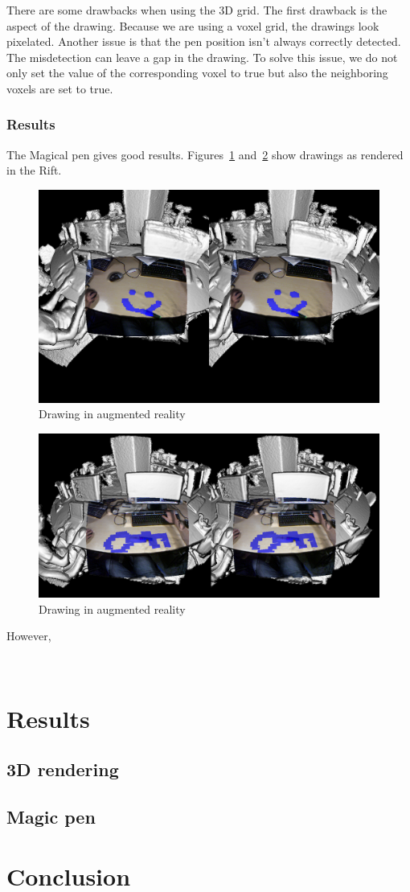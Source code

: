 \documentclass[12pt]{article}
\begin{document}
There are some drawbacks when using the 3D grid. The first drawback is the aspect of the drawing. Because we are using a voxel grid, the drawings look pixelated. Another issue is that the pen position isn't always correctly detected. The misdetection can leave a gap in the drawing. To solve this issue, we do not only set the value of the corresponding voxel to true but also the neighboring voxels are set to true.

\subsubsection{Results}
The Magical pen gives good results. Figures~\ref{fig:pen1} and~\ref{fig:pen2} show drawings as rendered in the Rift.
\begin{figure}[!h]
  \centering
  \includegraphics[scale=0.3]{pen1.png}
  \caption{\label{fig:pen1} Drawing in augmented reality}
\end{figure}

\begin{figure}[!h]
  \centering
  \includegraphics[scale=0.3]{pen2.png}
  \caption{\label{fig:pen2} Drawing in augmented reality}
\end{figure}
However, 

~~~
\newpage
\section{Results}
\subsection{3D rendering}
\subsection{Magic pen}

\newpage
\section*{Conclusion}

\newpage
{}


\end{document}
